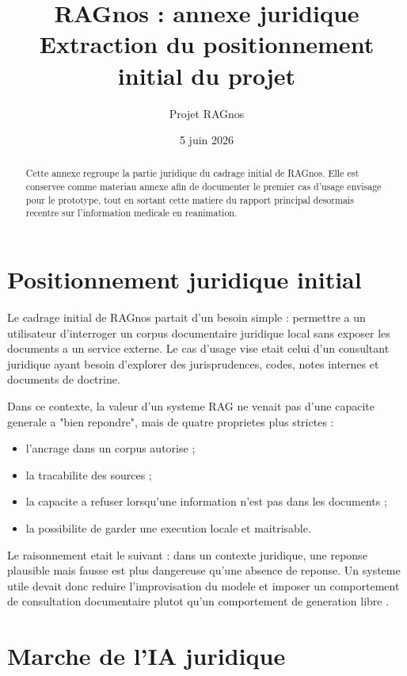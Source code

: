 \documentclass[11pt,a4paper]{article}
\title{\textbf{RAGnos : annexe juridique}\\
\large Extraction du positionnement initial du projet}
\author{Projet RAGnos}
\date{5 juin 2026}
\begin{document}
\maketitle

\begin{abstract}
Cette annexe regroupe la partie juridique du cadrage initial de RAGnos. Elle est conservee comme materiau annexe afin de documenter le premier cas d'usage envisage pour le prototype, tout en sortant cette matiere du rapport principal desormais recentre sur l'information medicale en reanimation.
\end{abstract}

\tableofcontents
\newpage

\section{Positionnement juridique initial}

Le cadrage initial de RAGnos partait d'un besoin simple : permettre a un utilisateur d'interroger un corpus documentaire juridique local sans exposer les documents a un service externe. Le cas d'usage vise etait celui d'un consultant juridique ayant besoin d'explorer des jurisprudences, codes, notes internes et documents de doctrine.

Dans ce contexte, la valeur d'un systeme RAG ne venait pas d'une capacite generale a "bien repondre", mais de quatre proprietes plus strictes :

\begin{itemize}
  \item l'ancrage dans un corpus autorise ;
  \item la tracabilite des sources ;
  \item la capacite a refuser lorsqu'une information n'est pas dans les documents ;
  \item la possibilite de garder une execution locale et maitrisable.
\end{itemize}

Le raisonnement etait le suivant : dans un contexte juridique, une reponse plausible mais fausse est plus dangereuse qu'une absence de reponse. Un systeme utile devait donc reduire l'improvisation du modele et imposer un comportement de consultation documentaire plutot qu'un comportement de generation libre \autocite{stanfordLegalHallucinations2024,legalRAGBench2026}.

\section{Marche de l'IA juridique}
\end{document}
